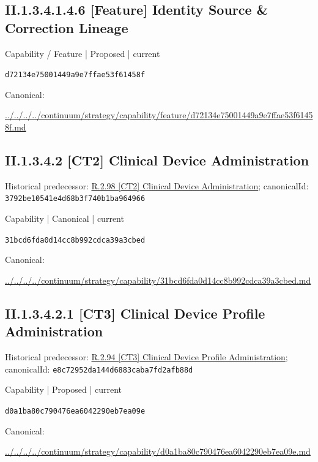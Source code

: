 \documentclass[10pt,a4paper]{article}
\begin{document}
\subsection*{II.1.3.4.1.4.6 [Feature] Identity Source \& Correction Lineage}
\label{element-d72134e75001449a9e7ffae53f61458f}
{\small Capability / Feature | Proposed | current}\par
\texttt{d72134e75001449a9e7ffae53f61458f}\par
Canonical: \par
{\footnotesize\url{../../../../continuum/strategy/capability/feature/d72134e75001449a9e7ffae53f61458f.md}}\par
\subsection*{II.1.3.4.2 [CT2] Clinical Device Administration}
Historical predecessor: \hyperref[element-3792be10541e4d68b3f740b1ba964966]{R.2.98 [CT2] Clinical Device Administration}; canonicalId: \texttt{3792be10541e4d68b3f740b1ba964966}\par
\label{element-31bcd6fda0d14cc8b992cdca39a3cbed}
{\small Capability | Canonical | current}\par
\texttt{31bcd6fda0d14cc8b992cdca39a3cbed}\par
Canonical: \par
{\footnotesize\url{../../../../continuum/strategy/capability/31bcd6fda0d14cc8b992cdca39a3cbed.md}}\par
\subsection*{II.1.3.4.2.1 [CT3] Clinical Device Profile Administration}
Historical predecessor: \hyperref[element-e8c72952da144d6883caba7fd2afb88d]{R.2.94 [CT3] Clinical Device Profile Administration}; canonicalId: \texttt{e8c72952da144d6883caba7fd2afb88d}\par
\label{element-d0a1ba80c790476ea6042290eb7ea09e}
{\small Capability | Proposed | current}\par
\texttt{d0a1ba80c790476ea6042290eb7ea09e}\par
Canonical: \par
{\footnotesize\url{../../../../continuum/strategy/capability/d0a1ba80c790476ea6042290eb7ea09e.md}}\par
\end{document}
